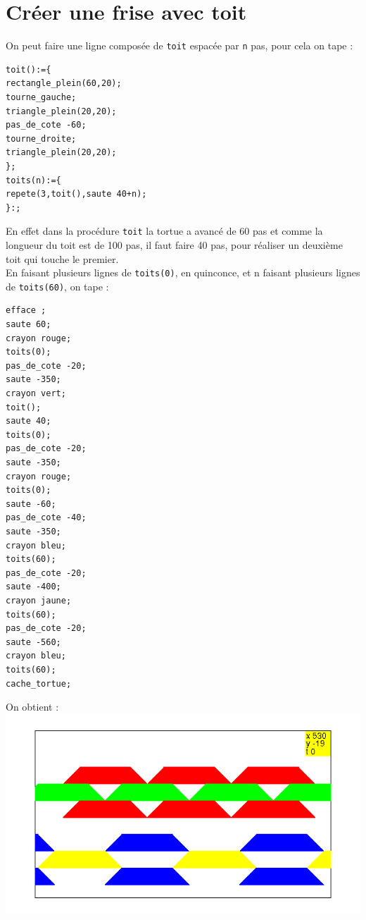 \documentclass[a4paper,11pt]{book}
\begin{document}
\section{Cr\'eer une frise avec toit}
On peut faire une ligne compos\'ee de {\tt toit} espac\'ee par {\tt n} pas,
pour cela on tape :
\begin{verbatim}
toit():={
rectangle_plein(60,20);
tourne_gauche;
triangle_plein(20,20);
pas_de_cote -60;
tourne_droite;
triangle_plein(20,20);
};
toits(n):={
repete(3,toit(),saute 40+n);
}:;
\end{verbatim} 
En effet dans la proc\'edure {\tt toit} la tortue a avanc\'e de 60 pas et comme
la longueur du toit est de 100 pas, il faut faire 40 pas, pour r\'ealiser
 un deuxi\`eme toit qui touche le premier.\\
En faisant plusieurs lignes de {\tt toits(0)}, en quinconce, et
n faisant plusieurs lignes de {\tt toits(60)}, on tape :
\begin{verbatim}
efface ;
saute 60;
crayon rouge;
toits(0);
pas_de_cote -20;
saute -350;
crayon vert;
toit();
saute 40;
toits(0);
pas_de_cote -20;
saute -350;
crayon rouge;
toits(0);
saute -60;
pas_de_cote -40;
saute -350;
crayon bleu;
toits(60);
pas_de_cote -20;
saute -400;
crayon jaune;
toits(60);
pas_de_cote -20;
saute -560;
crayon bleu;
toits(60);
cache_tortue;

\end{verbatim}
On obtient :\\
\includegraphics[width=\textwidth]{torttoit}\\
%

%
\end{document}
